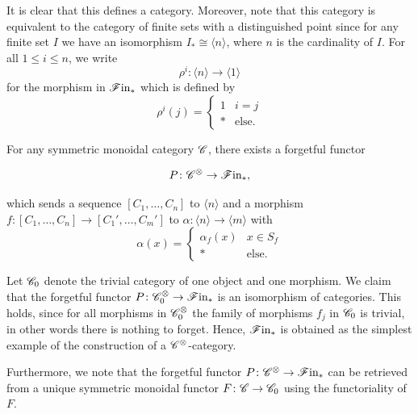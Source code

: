       It is clear that this defines a category. Moreover, note that this category
      is equivalent to the category of finite sets with a distinguished point
      since for any finite set $I$ we have an isomorphism $I_* \cong \langle n
      \rangle$, where $n$ is the cardinality of $I$. For all $1 \leq i \leq n$,
      we write 
      $$\rho^i \colon \langle n \rangle \to  \langle 1 \rangle$$ for the
      morphism in $\mathscr{F} \text{in}_{\ast}$ which is defined by
      \[
        \rho^i (j) = 
        \begin{cases}
            1 & i=j \\
            * & \text{else}.
        \end{cases}
      \]

      For any symmetric monoidal category $\mathscr{C}$, there exists a forgetful functor
      
      \[
      P \colon \mathscr{C}^{\otimes} \to \mathscr{F} \text{in}_{\ast},
      \]
      
      which sends a sequence $[C_1, \dots, C_n]$ to $\langle n \rangle$ and a
      morphism $f \colon [C_1, \dots, C_n] \to [C_1', \dots, C_m']$ to $\alpha
      \colon \langle n \rangle \to \langle m \rangle$ with
      \[\alpha (x) = \begin{cases} \alpha_f(x) & x \in S_f \\
          * & \text{else}. \end{cases}\]

    \begin{rem}
          Let $\mathscr{C}_0$ denote the trivial category of one object and one morphism.
          We claim that the forgetful functor $P \colon \mathscr{C}_0^{\otimes} \to \mathscr{F} \text{in}_{\ast}$
          is an isomorphism of categories. This holds, since for all morphisms
          in $\mathscr{C}_0^{\otimes}$ the family of morphisms $f_j$ in $\mathscr{C}_0$ is
          trivial, in other words there is nothing to forget. Hence, $\mathscr{F} \text{in}_{\ast}$ is
          obtained as the simplest example of the construction of a
          $\mathscr{C}^{\otimes}$-category.

          Furthermore, we note that the forgetful functor $P \colon \mathscr{C}^{\otimes} \to
          \mathscr{F} \text{in}_{\ast}$ can be retrieved from a unique symmetric monoidal functor $F
          \colon \mathscr{C} \to \mathscr{C}_0$ using the functoriality of $F$.
    \end{rem}

